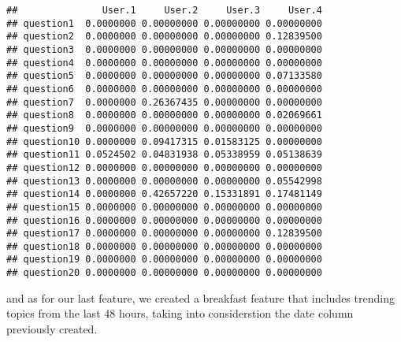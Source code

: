 \documentclass[]{article}
\begin{document}
\begin{verbatim}
##               User.1     User.2     User.3     User.4
## question1  0.0000000 0.00000000 0.00000000 0.00000000
## question2  0.0000000 0.00000000 0.00000000 0.12839500
## question3  0.0000000 0.00000000 0.00000000 0.00000000
## question4  0.0000000 0.00000000 0.00000000 0.00000000
## question5  0.0000000 0.00000000 0.00000000 0.07133580
## question6  0.0000000 0.00000000 0.00000000 0.00000000
## question7  0.0000000 0.26367435 0.00000000 0.00000000
## question8  0.0000000 0.00000000 0.00000000 0.02069661
## question9  0.0000000 0.00000000 0.00000000 0.00000000
## question10 0.0000000 0.09417315 0.01583125 0.00000000
## question11 0.0524502 0.04831938 0.05338959 0.05138639
## question12 0.0000000 0.00000000 0.00000000 0.00000000
## question13 0.0000000 0.00000000 0.00000000 0.05542998
## question14 0.0000000 0.42657220 0.15331891 0.17481149
## question15 0.0000000 0.00000000 0.00000000 0.00000000
## question16 0.0000000 0.00000000 0.00000000 0.00000000
## question17 0.0000000 0.00000000 0.00000000 0.12839500
## question18 0.0000000 0.00000000 0.00000000 0.00000000
## question19 0.0000000 0.00000000 0.00000000 0.00000000
## question20 0.0000000 0.00000000 0.00000000 0.00000000
\end{verbatim}

and as for our last feature, we created a breakfast feature that
includes trending topics from the last 48 hours, taking into
considerstion the date column previously created.
\end{document}
